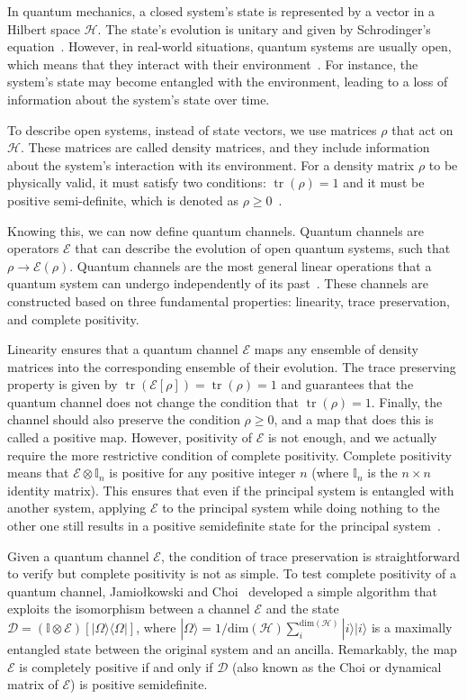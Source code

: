 \documentclass[10pt,letterpaper]{article} %
\DeclareMathOperator{\tr}{tr}
\begin{document}
In quantum mechanics, a closed system's state is represented by a vector in a
Hilbert space $\mathcal{H}$.  The state's evolution is unitary and given by
Schrodinger's equation~\cite{Rieffel}.  However, in real-world situations,
quantum systems are usually open, which means that they interact with their
environment~\cite{breuer2007theory}.  For instance, the system's state may become
entangled with the environment, leading to a loss of information about the
system's state over time.

To describe open systems, instead of state vectors, we use matrices $\rho$ that
act on $\mathcal{H}$.  These matrices are called density matrices, and they
include information about the system's interaction with its environment.  For a
density matrix $\rho$ to be physically valid, it must satisfy two conditions:
$\tr(\rho) = 1$ and it must be positive semi-definite, which is denoted as
$\rho \geq 0$~\cite{chuangbook}.


Knowing this, we can now define quantum channels.  Quantum channels are
operators $\mathcal{E}$ that can describe the evolution of open quantum
systems, such that $\rho \rightarrow \mathcal{E}(\rho)$.  Quantum channels are
the most general linear operations that a quantum system can undergo
independently of its past~\cite{zimansbook,cirac}.  These channels are
constructed based on three fundamental properties: linearity, trace
preservation, and complete positivity.

Linearity ensures that a quantum channel $\mathcal{E}$ maps any ensemble of
density matrices into the corresponding ensemble of their evolution.  The trace
preserving property is given by $\tr (\mathcal{E}[\rho]) = \tr (\rho) = 1$ and
guarantees that the quantum channel does not change the condition that
$\tr(\rho) = 1$.  Finally, the channel should also preserve the condition $\rho
\geq 0$, and a map that does this is called a positive map.  However,
positivity of $\mathcal{E}$ is not enough, and we actually require the more
restrictive condition of complete positivity.  Complete positivity means that
$\mathcal{E} \otimes \mathbb{I}_n$ is positive for any positive integer $n$
(where $\mathbb{I}_n$ is the $n\times n$ identity matrix).  This ensures that
even if the principal system is entangled with another system, applying
$\mathcal{E}$ to the principal system while doing nothing to the other one
still results in  a positive semidefinite state for the principal
system~\cite{chuangbook}. 

Given a quantum channel $\mathcal{E}$, the condition of trace preservation is
straightforward to verify but complete positivity is not as simple.  To test
complete positivity of a quantum channel, Jamiołkowski and
Choi~\cite{choi,jamil} developed a simple algorithm that exploits the
isomorphism between a channel $\mathcal{E}$ and the state $\mathcal{D} =
(\mathbb{I} \otimes \mathcal{E}) [|\Omega \rangle \langle  \Omega|]$, where
$|\Omega\rangle = 1/\text{dim}(\mathcal{H}) \sum_{i}^{\text{dim}(\mathcal{H})}
|i \rangle |i \rangle$ is a maximally entangled state between the original
system and an ancilla.  Remarkably, the map $\mathcal{E}$ is completely
positive if and only if $\mathcal{D}$ (also known as the Choi or dynamical
matrix of $\mathcal{E}$) is positive semidefinite.
\end{document}
